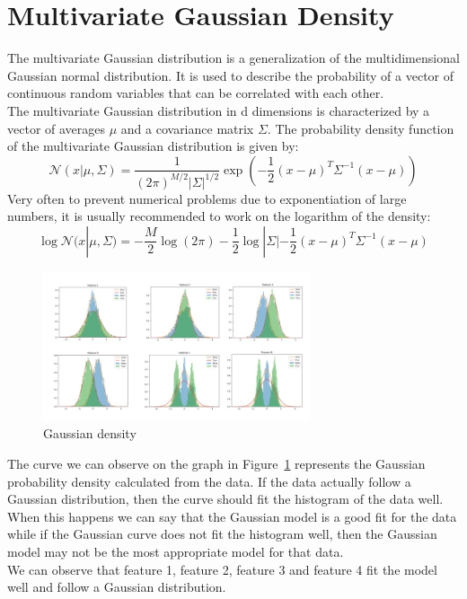 \documentclass{article}
\begin{document}
\section{Multivariate Gaussian Density}
The multivariate Gaussian distribution is a generalization of the multidimensional Gaussian normal distribution. It is used to describe the probability of a vector of continuous random variables that can be correlated with each other.\\
The multivariate Gaussian distribution in d dimensions is characterized by a vector of averages \(\mu\)  and a covariance matrix \(\Sigma\). The probability density function of the multivariate Gaussian distribution is given by:
\begin{equation}
    \mathcal{N}(x|\mu,\Sigma ) = \frac{1}{(2\pi)^{M/2}|\Sigma|^{1/2}} \exp\left(-\frac{1}{2}(x-\mu)^T\Sigma^{-1}(x-\mu)\right)
\end{equation}
Very often to prevent numerical problems due to exponentiation of large numbers, it is usually recommended to work on the logarithm of the density:
\begin{equation}
    \log \mathcal{N}(x|\mu,\Sigma ) = - \frac{M}{2} \log(2\pi) -\frac{1}{2} \log |\Sigma| - \frac{1}{2}(x-\mu)^T\Sigma^{-1}(x-\mu) 
\end{equation}
\begin{figure}[H]
    \centering
    \includegraphics[width=0.7\textwidth]{./img/GaussianDensity.jpeg}
    \caption{Gaussian density}
    \label{fig:gaussianD}
\end{figure} 
The curve we can observe on the graph in Figure~\ref{fig:gaussianD} represents the Gaussian probability density calculated from the data. If the data actually follow a Gaussian distribution, then the curve should fit the histogram of the data well. When this happens we can say that the Gaussian model is a good fit for the data while if the Gaussian curve does not fit the histogram well, then the Gaussian model may not be the most appropriate model for that data.\\
We can observe that feature 1, feature 2, feature 3 and feature 4 fit the model well and follow a Gaussian distribution.
\end{document}
